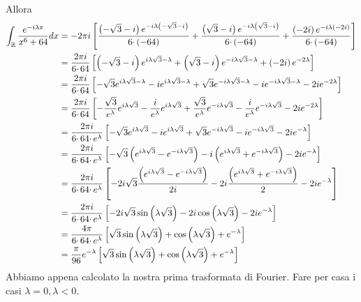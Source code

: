 Allora
\begin{align*}
\int _{\mathbb{R} }\frac{e^{-i\lambda x}}{x^{6} +64} dx & =-2\pi i\left[\frac{\left( -\sqrt{3} -i\right) e^{-i\lambda \left( -\sqrt{3} -i\right)}}{6\cdotp \left( -64\right)} +\frac{\left(\sqrt{3} -i\right) e^{-i\lambda \left(\sqrt{3} -i\right)}}{6\cdotp \left( -64\right)} +\frac{\left( -2i\right) e^{-i\lambda \left( -2i\right)}}{6\cdotp \left( -64\right)}\right]\\
 & =\frac{2\pi i}{6\cdotp 64}\left[\left( -\sqrt{3} -i\right) e^{i\lambda \sqrt{3} -\lambda } +\left(\sqrt{3} -i\right) e^{-i\lambda \sqrt{3} -\lambda } +\left( -2i\right) e^{-2\lambda }\right]\\
 & =\frac{2\pi i}{6\cdotp 64}\left[ -\sqrt{3} e^{i\lambda \sqrt{3} -\lambda } -ie^{i\lambda \sqrt{3} -\lambda } +\sqrt{3} e^{-i\lambda \sqrt{3} -\lambda } -ie^{-i\lambda \sqrt{3} -\lambda } -2ie^{-2\lambda }\right]\\
 & =\frac{2\pi i}{6\cdotp 64}\left[ -\frac{\sqrt{3}}{e^{\lambda }} e^{i\lambda \sqrt{3}} -\frac{i}{e^{\lambda }} e^{i\lambda \sqrt{3}} +\frac{\sqrt{3}}{e^{\lambda }} e^{-i\lambda \sqrt{3}} -\frac{i}{e^{\lambda }} e^{-i\lambda \sqrt{3}} -2ie^{-2\lambda }\right]\\
 & =\frac{2\pi i}{6\cdotp 64\cdotp e^{\lambda }}\left[ -\sqrt{3} e^{i\lambda \sqrt{3}} -ie^{i\lambda \sqrt{3}} +\sqrt{3} e^{-i\lambda \sqrt{3}} -ie^{-i\lambda \sqrt{3}} -2ie^{-\lambda }\right]\\
 & =\frac{2\pi i}{6\cdotp 64\cdotp e^{\lambda }}\left[ -\sqrt{3}\left( e^{i\lambda \sqrt{3}} -e^{-i\lambda \sqrt{3}}\right) -i\left( e^{i\lambda \sqrt{3}} +e^{-i\lambda \sqrt{3}}\right) -2ie^{-\lambda }\right]\\
 & =\frac{2\pi i}{6\cdotp 64\cdotp e^{\lambda }}\left[ -2i\sqrt{3}\frac{\left( e^{i\lambda \sqrt{3}} -e^{-i\lambda \sqrt{3}}\right)}{2i} -2i\frac{\left( e^{i\lambda \sqrt{3}} +e^{-i\lambda \sqrt{3}}\right)}{2} -2ie^{-\lambda }\right]\\
 & =\frac{2\pi i}{6\cdotp 64\cdotp e^{\lambda }}\left[ -2i\sqrt{3}\sin\left( \lambda \sqrt{3}\right) -2i\cos\left( \lambda \sqrt{3}\right) -2ie^{-\lambda }\right]\\
 & =\frac{4\pi }{6\cdotp 64\cdotp e^{\lambda }}\left[\sqrt{3}\sin\left( \lambda \sqrt{3}\right) +\cos\left( \lambda \sqrt{3}\right) +e^{-\lambda }\right]\\
 & =\frac{\pi }{96} e^{-\lambda }\left[\sqrt{3}\sin\left( \lambda \sqrt{3}\right) +\cos\left( \lambda \sqrt{3}\right) +e^{-\lambda }\right]
\end{align*}
Abbiamo appena calcolato la nostra prima trasformata di Fourier. Fare per casa i casi $\lambda =0,\lambda < 0$.
\Soluzione

